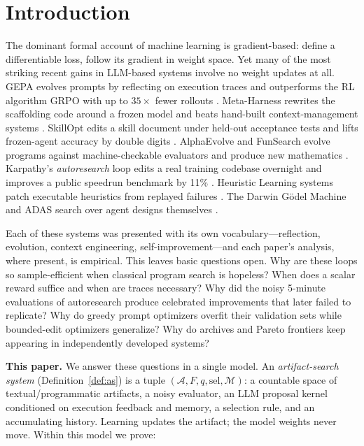 \documentclass{article}
\theoremstyle{plain}
\theoremstyle{definition}
\theoremstyle{remark}
\newcommand{\A}{\mathcal{A}}
\newcommand{\M}{\mathcal{M}}
\newcommand{\sel}{\mathrm{sel}}
\begin{document}
\section{Introduction}
\label{sec:intro}

The dominant formal account of machine learning is gradient-based: define a differentiable loss, follow its gradient in weight space. Yet many of the most striking recent gains in LLM-based systems involve no weight updates at all. GEPA evolves prompts by reflecting on execution traces and outperforms the RL algorithm GRPO with up to $35\times$ fewer rollouts \cite{agrawal2025gepa}. Meta-Harness rewrites the scaffolding code around a frozen model and beats hand-built context-management systems \cite{lee2026metaharness}. SkillOpt edits a skill document under held-out acceptance tests and lifts frozen-agent accuracy by double digits \cite{yang2026skillopt}. AlphaEvolve and FunSearch evolve programs against machine-checkable evaluators and produce new mathematics \cite{novikov2025alphaevolve,romeraparedes2024funsearch}. Karpathy's \emph{autoresearch} loop edits a real training codebase overnight and improves a public speedrun benchmark by 11\% \cite{karpathy2026autoresearch}. Heuristic Learning systems patch executable heuristics from replayed failures \cite{weng2026hl}. The Darwin G\"odel Machine and ADAS search over agent designs themselves \cite{zhang2025dgm,hu2025adas}.

Each of these systems was presented with its own vocabulary---reflection, evolution, context engineering, self-improvement---and each paper's analysis, where present, is empirical. This leaves basic questions open. Why are these loops so sample-efficient when classical program search is hopeless? When does a scalar reward suffice and when are traces necessary? Why did the noisy 5-minute evaluations of autoresearch produce celebrated improvements that later failed to replicate? Why do greedy prompt optimizers overfit their validation sets while bounded-edit optimizers generalize? Why do archives and Pareto frontiers keep appearing in independently developed systems?

\textbf{This paper.} We answer these questions in a single model. An \emph{artifact-search system} (Definition~\ref{def:as}) is a tuple $(\A, F, q, \sel, \M)$: a countable space of textual/programmatic artifacts, a noisy evaluator, an LLM proposal kernel conditioned on execution feedback and memory, a selection rule, and an accumulating history. Learning updates the artifact; the model weights never move. Within this model we prove:
\end{document}
